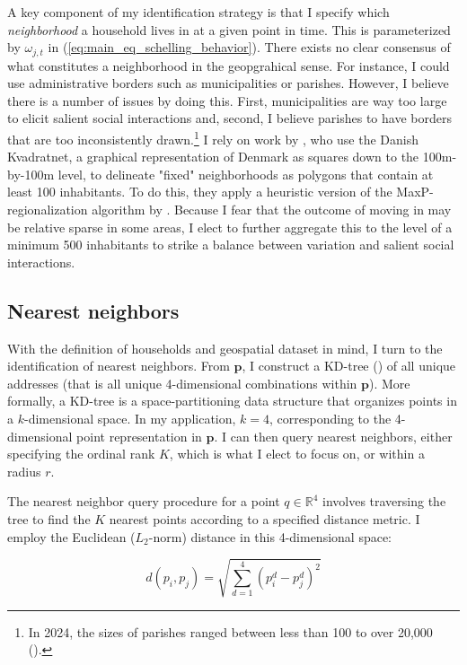 \documentclass[main.tex]{subfiles}
\begin{document}
A key component of my identification strategy is that I specify which \textit{neighborhood} a household lives in at a given point in time. This is parameterized by $\omega_{j,t}$ in (\ref{eq:main_eq_schelling_behavior}). There exists no clear consensus of what constitutes a neighborhood in the geopgrahical sense. For instance, I could use administrative borders such as municipalities or parishes. However, I believe there is a number of issues by doing this. First, municipalities are way too large to elicit salient social interactions and, second, I believe parishes to have borders that are too inconsistently drawn.\footnote{In 2024, the sizes of parishes ranged between less than 100 to over 20,000 (\textcite{dst_sogn_stats}).} I rely on work by \textcite{nabolagsatlas_neighborhoods_boje2023}, who use the Danish Kvadratnet, a graphical representation of Denmark as squares down to the 100m-by-100m level, to delineate "fixed" neighborhoods as polygons that contain at least 100 inhabitants. To do this, they apply a heuristic version of the MaxP-regionalization algorithm by \textcite{maxp_heuristic_wei2021efficient}. Because I fear that the outcome of moving in may be relative sparse in some areas, I elect to further aggregate this to the level of a minimum 500 inhabitants to strike a balance between variation and salient social interactions. 


\subsection{Nearest neighbors}
With the definition of households and geospatial dataset in mind, I turn to the identification of nearest neighbors. From $\mathbf{p}$, I construct a KD-tree (\textcite{bentley1975multidimensional}) of all unique addresses (that is all unique 4-dimensional combinations within $\mathbf{p}$). More formally, a KD-tree is a space-partitioning data structure that organizes points in a $k$-dimensional space. In my application, $k=4$, corresponding to the 4-dimensional point representation in $\mathbf{p}$. I can then query nearest neighbors, either specifying the ordinal rank $K$, which is what I elect to focus on, or within a radius $r$.

The nearest neighbor query procedure for a point $q \in \mathbb{R}^4$ involves traversing the tree to find the $K$ nearest points according to a specified distance metric. I employ the Euclidean ($L_2$-norm) distance in this 4-dimensional space:

\begin{equation}
d(p_i, p_j) = \sqrt{\sum_{d=1}^{4} (p_i^d - p_j^d)^2}
\end{equation}
\end{document}
